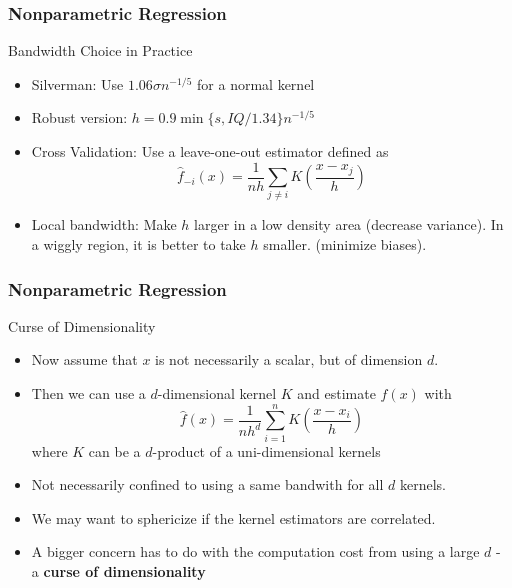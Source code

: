 \documentclass{beamer}
\begin{document}
\begin{frame}
\frametitle{Nonparametric Regression}
Bandwidth Choice in Practice
\begin{itemize}
\item Silverman: Use $1.06\sigma n^{-1/5}$ for a normal kernel
\item Robust version: $ h=0.9 \min\{s,IQ/1.34\}n^{-1/5}$
\item Cross Validation: Use a leave-one-out estimator defined as
 \[
 \hat{f}_{-i}(x) = \frac{1}{nh}\sum_{j\neq i}K\left(\frac{x-x_j}{h}\right)
 \]
 \item Local bandwidth: Make $h$ larger in a low density area (decrease variance). In a wiggly region, it is better to take $h$ smaller. (minimize biases). 
\end{itemize}
\end{frame}

\begin{frame}
\frametitle{Nonparametric Regression}
Curse of Dimensionality
\begin{itemize}
\item  Now assume that $x$ is not necessarily a scalar, but of dimension $d$. 
\item Then we can use a $d$-dimensional kernel $K$ and estimate $f(x)$ with
 \[
 \hat{f}(x)= \frac{1}{nh^d}\sum_{i=1}^nK\left(\frac{x-x_i}{h}\right)
 \]
 where $K$ can be a $d$-product of a uni-dimensional kernels
 \item Not necessarily confined to using a same bandwith for all $d$ kernels.
\item We may want to sphericize if the kernel estimators are correlated.
\item  A bigger concern has to do with the computation cost from using a large $d$ - a \textbf{curse of dimensionality}
\end{itemize}
\end{frame}
\end{document}
